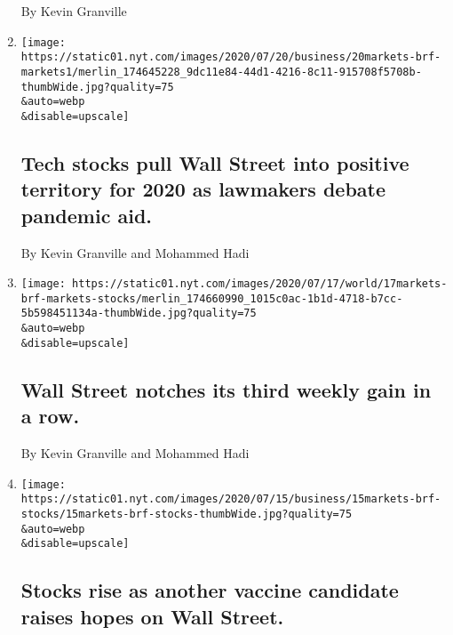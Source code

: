 \begin{enumerate}
  By Kevin Granville
\item
  \href{/live/2020/07/20/business/stock-market-today-coronavirus/tech-stocks-pull-wall-street-into-positive-territory-for-2020-as-lawmakers-debate-pandemic-aid}{}

  \texttt{[image: https://static01.nyt.com/images/2020/07/20/business/20markets-brf-markets1/merlin\_174645228\_9dc11e84-44d1-4216-8c11-915708f5708b-thumbWide.jpg?quality=75\\\&auto=webp\\\&disable=upscale]}

  \hypertarget{tech-stocks-pull-wall-street-into-positive-territory-for-2020-as-lawmakers-debate-pandemic-aid}{%
  \subsection{Tech stocks pull Wall Street into positive territory for
  2020 as lawmakers debate pandemic
  aid.}\label{tech-stocks-pull-wall-street-into-positive-territory-for-2020-as-lawmakers-debate-pandemic-aid}}

  By Kevin Granville and Mohammed Hadi
\item
  \href{/live/2020/07/17/business/stock-market-today-coronavirus/wall-street-notches-its-third-weekly-gain-in-a-row}{}

  \texttt{[image: https://static01.nyt.com/images/2020/07/17/world/17markets-brf-markets-stocks/merlin\_174660990\_1015c0ac-1b1d-4718-b7cc-5b598451134a-thumbWide.jpg?quality=75\\\&auto=webp\\\&disable=upscale]}

  \hypertarget{wall-street-notches-its-third-weekly-gain-in-a-row}{%
  \subsection{Wall Street notches its third weekly gain in a
  row.}\label{wall-street-notches-its-third-weekly-gain-in-a-row}}

  By Kevin Granville and Mohammed Hadi
\item
  \href{/live/2020/07/15/business/stock-market-today-coronavirus/stocks-rise-as-another-vaccine-candidate-raises-hopes-on-wall-street}{}

  \texttt{[image: https://static01.nyt.com/images/2020/07/15/business/15markets-brf-stocks/15markets-brf-stocks-thumbWide.jpg?quality=75\\\&auto=webp\\\&disable=upscale]}

  \hypertarget{stocks-rise-as-another-vaccine-candidate-raises-hopes-on-wall-street}{%
  \subsection{Stocks rise as another vaccine candidate raises hopes on
  Wall
  Street.}\label{stocks-rise-as-another-vaccine-candidate-raises-hopes-on-wall-street}}


\end{enumerate}
